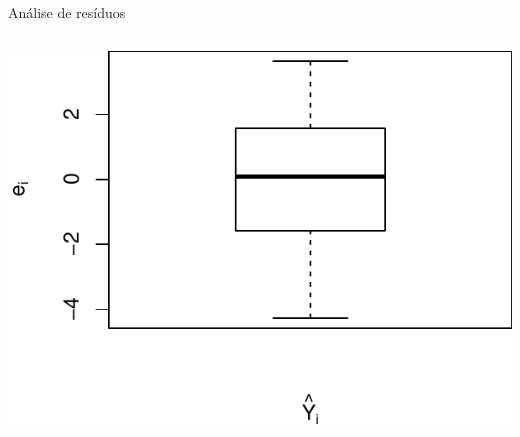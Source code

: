 \documentclass{beamer}\usepackage[]{graphicx}\usepackage[]{color}
\newenvironment{knitrout}{}{} %
\renewenvironment{knitrout}{\setlength{\topsep}{0mm}}{}
\begin{document}
\begin{frame}{Análise de resíduos}
\begin{columns}[c]
\begin{knitrout}
\includegraphics[width=1\linewidth]{figure/r2-2} 

\end{knitrout}
\end{columns}


\end{frame}
\end{document}
